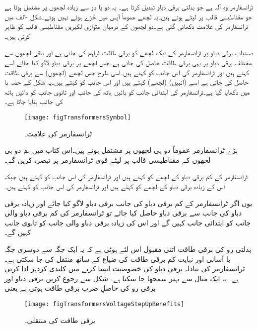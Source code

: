ٹرانسفارمر وہ آلہ ہے جو بدلتی برقی دباو تبدیل کرتا ہے۔ یہ دو یا دو سے زیادہ لچھوں پر مشتمل ہوتا ہے جو مقناطیسی قالب پر لپٹے ہوتے ہیں۔یہ لچھے عموماً آپس میں جُڑے ہوئے نہیں ہوتے۔شکل -الف میں ٹرانسفارمر کی علامت دکھائی گئی ہے۔دو لچھوں کے درمیان متوازی لکیریں مقناطیسی قالب کو ظاہر کرتی ہیں۔

دستیاب برقی دباو پر ٹرانسفارمر کے ایک لچھے کو برقی طاقت فراہم کی جاتی ہے اور باقی لچھوں سے  مختلف برقی دباو پر یہی برقی طاقت حاصل کی جاتی ہے۔جس لچھے پر برقی دباو لاگو کیا جائے اسے   کہتے ہیں اور ٹرانسفارمر کی اس جانب کو  کہتے ہیں۔اسی طرح جس لچھے (لچھوں) سے برقی طاقت حاصل کی جاتی ہے اسے (انہیں)   (لچھے) کہتے ہیں اور اس جانب کو   کہتے ہیں۔یہ شکل کے حصہ با میں دکھایا گیا ہے۔ٹرانسفارمر کی ابتدائی جانب کو بائیں ہاتھ کی جانب اور ثانوی جانب کو دائیں ہاتھ کی جانب بنایا جاتا ہے۔
\begin{figure}
\centering
\texttt{[image: figTransformersSymbol]}
\caption{ٹرانسفارمر کی علامت۔}
\label{شکل_ٹرانسفارمر_علامت}
\end{figure}

بڑے ٹرانسفارمر عموماً دو ہی لچھوں پر مشتمل ہوتے ہیں۔اس کتاب میں ہم دو ہی لچھوں کے مقناطیسی قالب پر لپٹے قوی ٹرانسفارمر پر تبصرہ کریں گے۔

	ٹرانسفارمر کے کم برقی دباو کے لچھے کو   کہتے ہیں اور ٹرانسفارمر کی اس جانب کو   کہتے ہیں جبکہ اس کے زیادہ برقی دباو کے لچھے کو   کہتے ہیں اور ٹرانسفارمر کی اس جانب کو   کہتے ہیں۔

یوں اگر ٹرانسفارمر کے کم برقی دباو کی جانب برقی دباو لاگو کیا جائے اور زیادہ برقی دباو کی جانب سے برقی دباو حاصل کیا جائے تو ٹرانسفارمر کی کم برقی دباو والی جانب کو ابتدائی جانب کہیں گے اور اس کی زیادہ برقی دباو والی جانب کو ثانوی جانب کہیں گے۔

بدلتی رو کی برقی طاقت اتنی مقبول اس لئے ہوئی ہے کہ یہ ایک جگہ سے دوسری جگہ با آسانی اور نہایت کم برقی طاقت کی ضیاع کے ساتھ منتقل کی جا سکتی ہے۔ٹرانسفارمر کی تبادلہ برقی دباو کی خصوصیت ایسا کرنے میں کلیدی کردہر ادا کرتی ہے۔ یہ ایک مثال سے بہتر سمجھا جا سکتا ہے۔
%
شکل   سے رجوع کریں۔برقی دباو اور برقی رو کی حاصلِ ضرب برقی طاقت ہوتی ہے یعنی
\begin{figure}
\centering
\texttt{[image: figTransformersVoltageStepUpBenefits]}
\caption{برقی طاقت کی منتقلی۔}
\label{شکل_ٹرانسفارمر_برقی_طاقت_منتقلی}
\end{figure}

